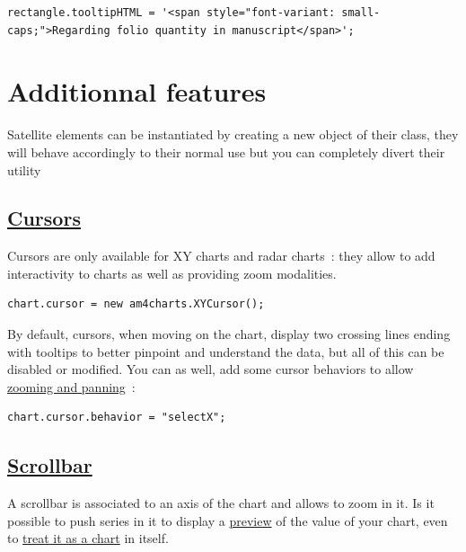 \documentclass[a4paper,12pt,twoside]{book}
\begin{document}
\begin{lstlisting}
rectangle.tooltipHTML = '<span style="font-variant: small-caps;">Regarding folio quantity in manuscript</span>';
\end{lstlisting}

		\section{Additionnal features}\label{additionnal-features}

Satellite elements can be instantiated by creating a new object of their class, they will behave accordingly to their normal use but you can completely divert their utility

			\subsection{\href{https://www.amcharts.com/docs/v4/concepts/chart-cursor/}{Cursors}}\label{cursors}

Cursors are only available for XY charts and radar charts~: they allow to add interactivity to charts as well as providing zoom modalities.

\begin{lstlisting}
chart.cursor = new am4charts.XYCursor();
\end{lstlisting}

By default, cursors, when moving on the chart, display two crossing lines ending with tooltips to better pinpoint and understand the data, but all of this can be disabled or modified. You can as well, add some cursor behaviors to allow \href{https://www.amcharts.com/docs/v4/concepts/chart-cursor/\#Zooming_panning}{zooming and panning}~:

\begin{lstlisting}
chart.cursor.behavior = "selectX";
\end{lstlisting}

			\subsection{\href{https://www.amcharts.com/docs/v4/reference/scrollbar/}{Scrollbar}}\label{scrollbar}

A scrollbar is associated to an axis of the chart and allows to zoom in it. Is it possible to push series in it to display a \href{https://www.amcharts.com/docs/v4/chart-types/xy-chart/\#Scrollbar_with_preview}{preview} of the value of your chart, even to \href{https://www.amcharts.com/docs/v4/tutorials/scrollbar-only-xy-chart/}{treat it as a chart} in itself.
\end{document}
